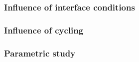 \subsubsection{Influence of interface conditions}
\subsubsection{Influence of cycling}
\subsubsection{Parametric study}
